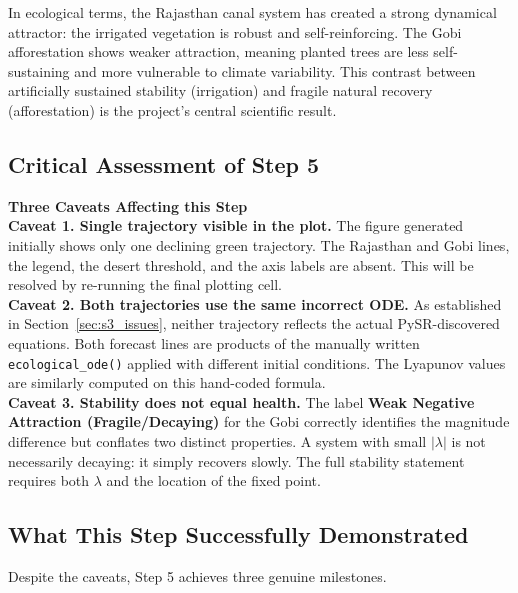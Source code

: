 \documentclass[12pt, a4paper]{article}
\begin{document}
In ecological terms, the Rajasthan canal system has created a strong
dynamical attractor: the irrigated vegetation is robust and
self-reinforcing. The Gobi afforestation shows weaker attraction, meaning
planted trees are less self-sustaining and more vulnerable to climate
variability. This contrast between artificially sustained stability
(irrigation) and fragile natural recovery (afforestation) is the project's
central scientific result.

\subsection{Critical Assessment of Step 5}
\label{sec:s5_issues}

\begin{mdframed}[style=warnbox]
\textbf{\textcolor{warnred}{Three Caveats Affecting this Step}}\\[6pt]
\textbf{Caveat 1. Single trajectory visible in the plot.}
The figure generated initially shows only one declining green trajectory. The
Rajasthan and Gobi lines, the legend, the desert threshold, and the axis
labels are absent. This will be resolved by re-running the final
plotting cell.\\[4pt]
\textbf{Caveat 2. Both trajectories use the same incorrect ODE.}
As established in Section~\ref{sec:s3_issues}, neither trajectory reflects
the actual PySR-discovered equations. Both forecast lines are products of
the manually written \texttt{ecological\_ode()} applied with different
initial conditions. The Lyapunov values are similarly computed on this
hand-coded formula.\\[4pt]
\textbf{Caveat 3. Stability does not equal health.}
The label \textbf{Weak Negative Attraction (Fragile/Decaying)} for the
Gobi correctly identifies the magnitude difference but conflates two
distinct properties. A system with small $|\lambda|$ is not necessarily
decaying: it simply recovers slowly. The full stability statement requires
both $\lambda$ and the location of the fixed point.
\end{mdframed}

\subsection{What This Step Successfully Demonstrated}

Despite the caveats, Step 5 achieves three genuine milestones.
\end{document}
